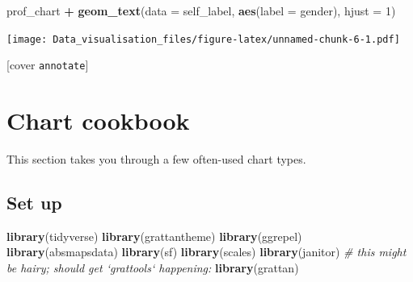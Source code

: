 \documentclass[]{book}
\newenvironment{Shaded}{\begin{snugshade}}{\end{snugshade}}
\newcommand{\CommentTok}[1]{\textcolor[rgb]{0.56,0.35,0.01}{\textit{#1}}}
\newcommand{\DataTypeTok}[1]{\textcolor[rgb]{0.13,0.29,0.53}{#1}}
\newcommand{\DecValTok}[1]{\textcolor[rgb]{0.00,0.00,0.81}{#1}}
\newcommand{\KeywordTok}[1]{\textcolor[rgb]{0.13,0.29,0.53}{\textbf{#1}}}
\newcommand{\NormalTok}[1]{#1}
\newcommand{\OperatorTok}[1]{\textcolor[rgb]{0.81,0.36,0.00}{\textbf{#1}}}
\newcommand{\StringTok}[1]{\textcolor[rgb]{0.31,0.60,0.02}{#1}}
\begin{document}
\begin{Shaded}
\begin{Highlighting}[]
\NormalTok{prof_chart }\OperatorTok{+}
\StringTok{  }\KeywordTok{geom_text}\NormalTok{(}\DataTypeTok{data =}\NormalTok{ self_label,}
            \KeywordTok{aes}\NormalTok{(}\DataTypeTok{label =}\NormalTok{ gender), }
            \DataTypeTok{hjust =} \DecValTok{1}\NormalTok{)}
\end{Highlighting}
\end{Shaded}

\texttt{[image: Data\_visualisation\_files/figure-latex/unnamed-chunk-6-1.pdf]}

{[}cover \texttt{annotate}{]}

\hypertarget{chart-cookbook}{%
\chapter{Chart cookbook}\label{chart-cookbook}}

This section takes you through a few often-used chart types.

\hypertarget{set-up}{%
\section{Set up}\label{set-up}}

\begin{Shaded}
\begin{Highlighting}[]
\KeywordTok{library}\NormalTok{(tidyverse)}
\KeywordTok{library}\NormalTok{(grattantheme)}
\KeywordTok{library}\NormalTok{(ggrepel)}
\KeywordTok{library}\NormalTok{(absmapsdata)}
\KeywordTok{library}\NormalTok{(sf)}
\KeywordTok{library}\NormalTok{(scales)}
\KeywordTok{library}\NormalTok{(janitor)}
\CommentTok{# this might be hairy; should get `grattools` happening:}
\KeywordTok{library}\NormalTok{(grattan)}
\end{Highlighting}
\end{Shaded}
\end{document}
